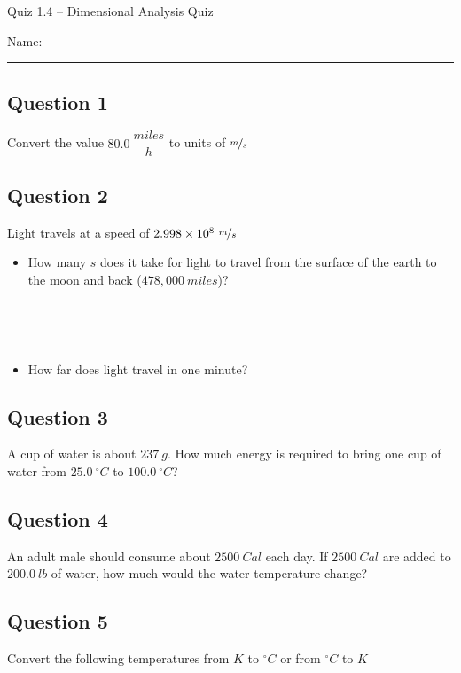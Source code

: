 \documentclass[11pt, letterpaper]{memoir}
\begin{document}
\begin{center}
	{\large	Quiz 1.4 -- Dimensional Analysis Quiz}
\end{center}
{\large Name: \rule[-1mm]{4in}{.1pt}
\subsection*{Question 1}
Convert the value $80.0~\dfrac{miles}{h}$ to units of $\nicefrac{m}{s}$

\vspace{3em}
\subsection*{Question 2}
Light travels at a speed of $2.998\times10^8~\nicefrac{m}{s}$
\begin{itemize}
	\item How many $s$ does it take for light to travel from the surface of the earth to the moon and back ($478,000~miles$)?

	      ~

	      ~

	\item How far does light travel in one minute?
\end{itemize}

\vspace{1em}
\subsection*{Question 3}
A cup of water is about $237~g$. How much energy is required to bring one cup of water from $25.0~^\circ C$ to $100.0~^\circ C$?

\vspace{3em}
\subsection*{Question 4}
An adult male should consume about $2500~Cal$ each day. If $2500~Cal$ are added to $200.0~lb$ of water, how much would the water temperature change?

\vspace{7em}
\subsection*{Question 5}
Convert the following temperatures from $K$ to $^\circ C$ or from $^\circ C$ to $K$

}
\end{document}
